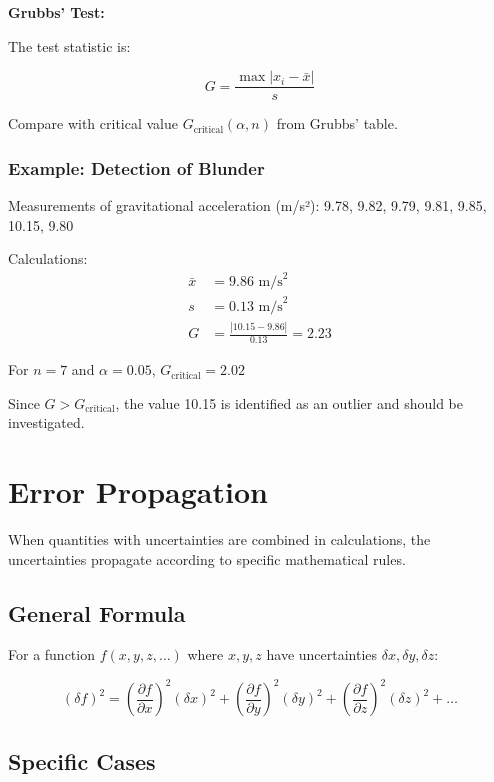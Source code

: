 \documentclass[twoside]{book}
\begin{document}
\textbf{Grubbs' Test:}

The test statistic is:

\begin{equation}
G = \frac{\max|x_i - \bar{x}|}{s}
\end{equation}

Compare with critical value $G_{\text{critical}}(\alpha, n)$ from Grubbs' table.

\subsubsection{Example: Detection of Blunder}

Measurements of gravitational acceleration (m/s²):
9.78, 9.82, 9.79, 9.81, 9.85, 10.15, 9.80

Calculations:
\begin{align}
\bar{x} &= 9.86 \text{ m/s}^2 \\
s &= 0.13 \text{ m/s}^2 \\
G &= \frac{|10.15 - 9.86|}{0.13} = 2.23
\end{align}

For $n = 7$ and $\alpha = 0.05$, $G_{\text{critical}} = 2.02$

Since $G > G_{\text{critical}}$, the value 10.15 is identified as an outlier and should be investigated.

\section{Error Propagation}

When quantities with uncertainties are combined in calculations, the uncertainties propagate according to specific mathematical rules.

\subsection{General Formula}

For a function $f(x, y, z, \ldots)$ where $x, y, z$ have uncertainties $\delta x, \delta y, \delta z$:

\begin{equation}
(\delta f)^2 = \left(\frac{\partial f}{\partial x}\right)^2(\delta x)^2 + \left(\frac{\partial f}{\partial y}\right)^2(\delta y)^2 + \left(\frac{\partial f}{\partial z}\right)^2(\delta z)^2 + \ldots
\end{equation}

\subsection{Specific Cases}
\end{document}
